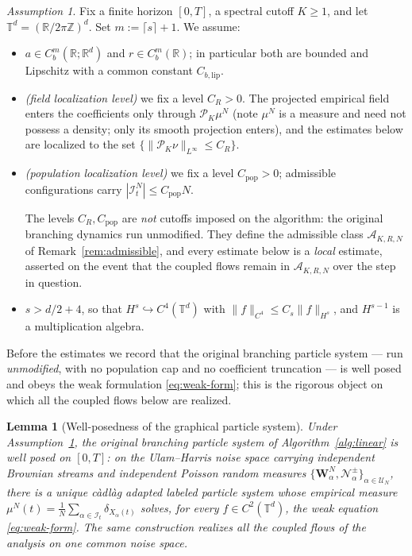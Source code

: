 \documentclass[a4paper,fleqn]{cas-sc}
\newtheorem{lemma}[theorem]{Lemma}
\theoremstyle{definition}
\theoremstyle{remark}
\newtheorem{assumption}{Assumption}
\begin{document}
\begin{assumption}\label{ass:time}
Fix a finite horizon $[0,T]$, a spectral cutoff $K\ge1$, and let
$\mathbb T^d=(\mathbb R/2\pi\mathbb Z)^d$. Set $m:=\lceil s\rceil+1$. We assume:
\begin{itemize}
\item[(B1)] $a\in C^m_b(\mathbb R;\mathbb R^d)$ and $r\in C^m_b(\mathbb R)$;
in particular both are bounded and Lipschitz with a common constant
$C_{b,\mathrm{lip}}$.
\item[(B2)] \emph{(field localization level)} we fix a level $C_R>0$. The projected
empirical field enters the coefficients only through $\mathcal P_K\mu^N$ (note $\mu^N$ is a
measure and need not possess a density; only its smooth projection enters), and the
estimates below are localized to the set $\{\|\mathcal P_K\nu\|_{L^\infty}\le C_R\}$.
\item[(B3)] \emph{(population localization level)} we fix a level $C_{\mathrm{pop}}>0$;
admissible configurations carry $|\mathcal I^N_t|\le C_{\mathrm{pop}}N$.

The levels $C_R,C_{\mathrm{pop}}$ are \emph{not} cutoffs imposed on the algorithm:
the original branching dynamics run unmodified. They define the admissible class
$\mathcal A_{K,R,N}$ of Remark~\ref{rem:admissible}, and every estimate below is a
\emph{local} estimate, asserted on the event that the coupled flows remain in
$\mathcal A_{K,R,N}$ over the step in question.
\item[(B4)] $s>d/2+4$, so that $H^s\hookrightarrow C^4(\mathbb T^d)$ with
$\|f\|_{C^4}\le C_s\|f\|_{H^s}$, and $H^{s-1}$ is a multiplication algebra.
\end{itemize}
\end{assumption}

Before the estimates we record that the original branching particle system --- run
\emph{unmodified}, with no population cap and no coefficient truncation --- is well posed and
obeys the weak formulation \eqref{eq:weak-form}; this is the rigorous object on which all the
coupled flows below are realized.

\begin{lemma}[Well-posedness of the graphical particle system]\label{lem:wellposed}
Under Assumption~\ref{ass:time}, the original branching particle system of
Algorithm~\ref{alg:linear} is well posed on $[0,T]$: on the Ulam--Harris noise space carrying
independent Brownian streams and independent Poisson random measures
$\{\mathbf W^N_\alpha,\mathcal N^\pm_\alpha\}_{\alpha\in\mathcal U_N}$, there is a unique c\`adl\`ag
adapted labeled particle system whose empirical measure
$\mu^N(t)=\frac1N\sum_{\alpha\in\mathcal I_t}\delta_{X_\alpha(t)}$ solves, for every
$f\in C^2(\mathbb T^d)$, the weak equation \eqref{eq:weak-form}. The same construction realizes all
the coupled flows of the analysis on one common noise space.
\end{lemma}
\end{document}
